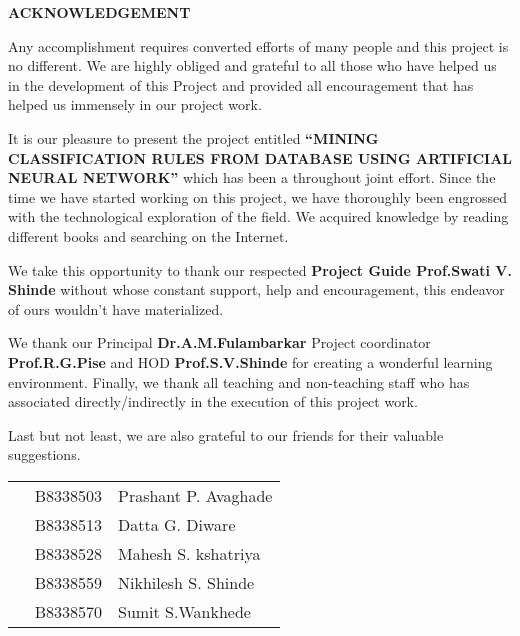 \begin{titlepage}
\begin{center}
\huge{\bf{ACKNOWLEDGEMENT\\}}\end{center}
\large{
\begin{sloppypar}
Any accomplishment requires converted efforts of many people and this project is no different. We are highly obliged and grateful to all those who have helped us in the development of this Project and provided all encouragement that has helped us immensely in our project work.
\end{sloppypar}
\begin{sloppypar}
It is our pleasure to present the project entitled \textbf{``MINING CLASSIFICATION RULES FROM DATABASE USING ARTIFICIAL NEURAL NETWORK''} which has been a throughout joint effort. Since the time we have started working on this project, we have thoroughly been engrossed with the technological exploration of the field. We acquired knowledge by reading different books and searching on the Internet.
\end{sloppypar}\begin{sloppypar}
 We take this opportunity to thank our respected \textbf{Project Guide Prof.Swati V. Shinde} without whose constant support, help and encouragement, this endeavor of ours wouldn’t have materialized.
\end{sloppypar}
\begin{sloppypar}
We thank our Principal \textbf{Dr.A.M.Fulambarkar} Project coordinator \textbf{Prof.R.G.Pise} and HOD \textbf{Prof.S.V.Shinde} for creating a wonderful learning environment. Finally, we thank all teaching and non-teaching staff who has associated directly/indirectly in the execution of this project work.
\end{sloppypar}
\begin{sloppypar}
Last but not least, we are also grateful to our friends for their valuable suggestions.\\
\end{sloppypar}}
\begin{table}[hbp]
 \begin{center}
    \begin{tabular}{   p{9cm}  l  l  }

                      \,               &    B8338503 & Prashant  P. Avaghade \\  
                       \,               &   B8338513 & Datta G. Diware \\  
                      \,                 &  B8338528 & Mahesh S. kshatriya \\  
                        \,             &    B8338559  & Nikhilesh S. Shinde \\  
                        \,             &    B8338570  & Sumit S.Wankhede \\  

    \end{tabular}
\end{center}
\end{table} 
\end{titlepage}